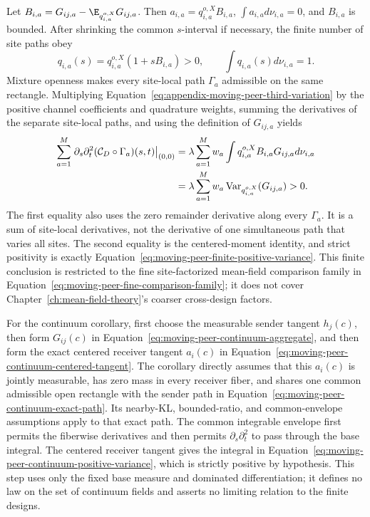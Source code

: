 Let \(B_{i,a}=G_{ij,a}-\E_{q_{i,a}^{o,X}}G_{ij,a}\). Then \(a_{i,a}=q_{i,a}^{o,X}B_{i,a}\), \(\int a_{i,a}d\nu_{i,a}=0\), and \(B_{i,a}\) is bounded. After shrinking the common \(s\)-interval if necessary, the finite number of site paths obey
\begin{equation}
q_{i,a}(s)=q_{i,a}^{o,X}(1+sB_{i,a})>0,
\qquad
\int q_{i,a}(s)d\nu_{i,a}=1.
\label{eq:appendix-moving-peer-positive-mixture}
\end{equation}
Mixture openness makes every site-local path \(\Gamma_a\) admissible on the same rectangle. Multiplying Equation~\eqref{eq:appendix-moving-peer-third-variation} by the positive channel coefficients and quadrature weights, summing the derivatives of the separate site-local paths, and using the definition of \(G_{ij,a}\) yields
\begin{align}
\sum_{a=1}^{M}\left.\partial_s\partial_t^2
(\mathcal C_D\circ\Gamma_a)(s,t)\right|_{(0,0)}
&=\lambda\sum_{a=1}^{M}w_a
\int q_{i,a}^{o,X}B_{i,a}G_{ij,a}d\nu_{i,a}\notag\\
&=\lambda\sum_{a=1}^{M}w_a
\operatorname{Var}_{q_{i,a}^{o,X}}(G_{ij,a})>0.
\label{eq:appendix-moving-peer-variance-identity}
\end{align}
The first equality also uses the zero remainder derivative along every \(\Gamma_a\). It is a sum of site-local derivatives, not the derivative of one simultaneous path that varies all sites. The second equality is the centered-moment identity, and strict positivity is exactly Equation~\eqref{eq:moving-peer-finite-positive-variance}. This finite conclusion is restricted to the fine site-factorized mean-field comparison family in Equation~\eqref{eq:moving-peer-fine-comparison-family}; it does not cover Chapter~\ref{ch:mean-field-theory}'s coarser cross-design factors.

For the continuum corollary, first choose the measurable sender tangent \(h_j(c)\), then form \(G_{ij}(c)\) in Equation~\eqref{eq:moving-peer-continuum-aggregate}, and then form the exact centered receiver tangent \(a_i(c)\) in Equation~\eqref{eq:moving-peer-continuum-centered-tangent}. The corollary directly assumes that this \(a_i(c)\) is jointly measurable, has zero mass in every receiver fiber, and shares one common admissible open rectangle with the sender path in Equation~\eqref{eq:moving-peer-continuum-exact-path}. Its nearby-KL, bounded-ratio, and common-envelope assumptions apply to that exact path. The common integrable envelope first permits the fiberwise derivatives and then permits \(\partial_s\partial_t^2\) to pass through the base integral. The centered receiver tangent gives the integral in Equation~\eqref{eq:moving-peer-continuum-positive-variance}, which is strictly positive by hypothesis. This step uses only the fixed base measure and dominated differentiation; it defines no law on the set of continuum fields and asserts no limiting relation to the finite designs.

